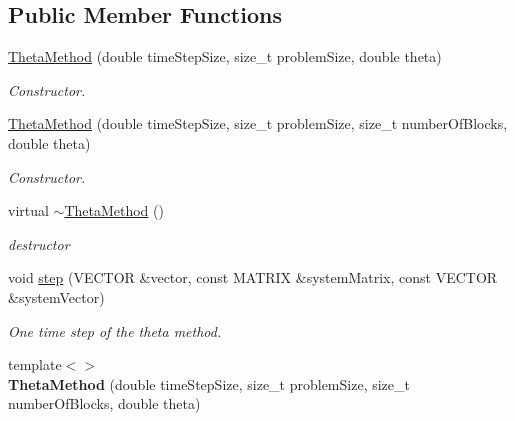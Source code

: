 \subsection*{Public Member Functions}
\begin{DoxyCompactItemize}
\item 
\hyperlink{classnatrium_1_1ThetaMethod_a30c8135385f1612ab8e8e7dd8ad21e42}{Theta\-Method} (double time\-Step\-Size, size\-\_\-t problem\-Size, double theta)
\begin{DoxyCompactList}\small\item\em Constructor. \end{DoxyCompactList}\item 
\hyperlink{classnatrium_1_1ThetaMethod_ae5cd52ec9564393a9a14296262ae0512}{Theta\-Method} (double time\-Step\-Size, size\-\_\-t problem\-Size, size\-\_\-t number\-Of\-Blocks, double theta)
\begin{DoxyCompactList}\small\item\em Constructor. \end{DoxyCompactList}\item 
\hypertarget{classnatrium_1_1ThetaMethod_ac742c678ab9674722295585f10d27279}{virtual \hyperlink{classnatrium_1_1ThetaMethod_ac742c678ab9674722295585f10d27279}{$\sim$\-Theta\-Method} ()}\label{classnatrium_1_1ThetaMethod_ac742c678ab9674722295585f10d27279}

\begin{DoxyCompactList}\small\item\em destructor \end{DoxyCompactList}\item 
\hypertarget{classnatrium_1_1ThetaMethod_ae16bd6a1f7f10b161c10909ad6a8744c}{void \hyperlink{classnatrium_1_1ThetaMethod_ae16bd6a1f7f10b161c10909ad6a8744c}{step} (V\-E\-C\-T\-O\-R \&vector, const M\-A\-T\-R\-I\-X \&system\-Matrix, const V\-E\-C\-T\-O\-R \&system\-Vector)}\label{classnatrium_1_1ThetaMethod_ae16bd6a1f7f10b161c10909ad6a8744c}

\begin{DoxyCompactList}\small\item\em One time step of the theta method. \end{DoxyCompactList}\item 
\hypertarget{classnatrium_1_1ThetaMethod_af747ecc6907946598f01eca741a57dae}{{\footnotesize template$<$$>$ }\\{\bfseries Theta\-Method} (double time\-Step\-Size, size\-\_\-t problem\-Size, size\-\_\-t number\-Of\-Blocks, double theta)}\label{classnatrium_1_1ThetaMethod_af747ecc6907946598f01eca741a57dae}

\end{DoxyCompactItemize}


